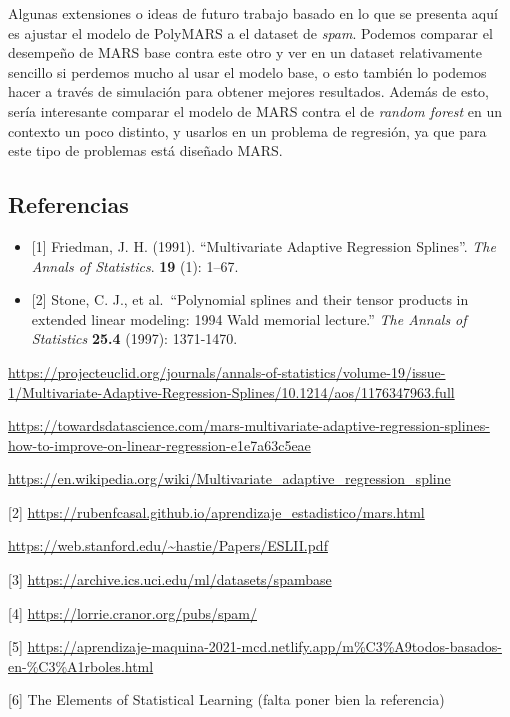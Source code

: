 \documentclass[
]{article}
\begin{document}
Algunas extensiones o ideas de futuro trabajo basado en lo que se
presenta aquí es ajustar el modelo de PolyMARS a el dataset de
\emph{spam}. Podemos comparar el desempeño de MARS base contra este otro
y ver en un dataset relativamente sencillo si perdemos mucho al usar el
modelo base, o esto también lo podemos hacer a través de simulación para
obtener mejores resultados. Además de esto, sería interesante comparar
el modelo de MARS contra el de \emph{random forest} en un contexto un
poco distinto, y usarlos en un problema de regresión, ya que para este
tipo de problemas está diseñado MARS.

\hypertarget{referencias}{%
\subsection{Referencias}\label{referencias}}

\begin{itemize}
\item
  {[}1{]} Friedman, J. H. (1991). ``Multivariate Adaptive Regression
  Splines''. \emph{The Annals of Statistics}. \textbf{19} (1): 1--67.
\item
  {[}2{]} Stone, C. J., et al.~``Polynomial splines and their tensor
  products in extended linear modeling: 1994 Wald memorial lecture.''
  \emph{The Annals of Statistics} \textbf{25.4} (1997): 1371-1470.
\end{itemize}

\url{https://projecteuclid.org/journals/annals-of-statistics/volume-19/issue-1/Multivariate-Adaptive-Regression-Splines/10.1214/aos/1176347963.full}

\url{https://towardsdatascience.com/mars-multivariate-adaptive-regression-splines-how-to-improve-on-linear-regression-e1e7a63c5eae}

\url{https://en.wikipedia.org/wiki/Multivariate_adaptive_regression_spline}

{[}2{]}
\url{https://rubenfcasal.github.io/aprendizaje_estadistico/mars.html}

\url{https://web.stanford.edu/~hastie/Papers/ESLII.pdf}

{[}3{]} \url{https://archive.ics.uci.edu/ml/datasets/spambase}

{[}4{]} \url{https://lorrie.cranor.org/pubs/spam/}

{[}5{]}
\url{https://aprendizaje-maquina-2021-mcd.netlify.app/m\%C3\%A9todos-basados-en-\%C3\%A1rboles.html}

{[}6{]} The Elements of Statistical Learning (falta poner bien la
referencia)
\end{document}
